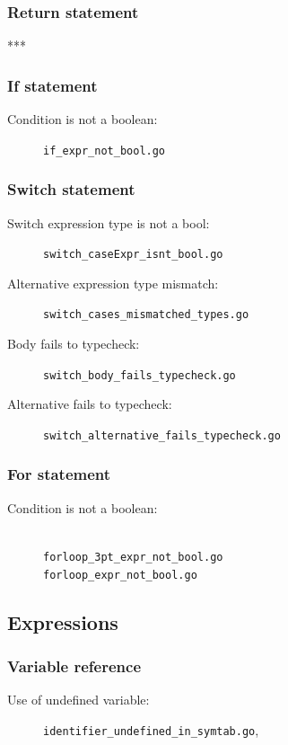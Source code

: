 \documentclass[oneside]{article}
\begin{document}
\subsubsection{Return statement}
***

\subsubsection{If statement}
\begin{description}
  \item[Condition is not a boolean:] \verb|if_expr_not_bool.go|
\end{description}

\subsubsection{Switch statement}
\begin{description}
  \item[Switch expression type is not a bool:] \verb|switch_caseExpr_isnt_bool.go|
  \item[Alternative expression type mismatch:] \verb|switch_cases_mismatched_types.go|
  \item[Body fails to typecheck:] \verb|switch_body_fails_typecheck.go|
  \item[Alternative fails to typecheck:] \verb|switch_alternative_fails_typecheck.go|
\end{description}

\subsubsection{For statement}

\begin{description}
  \item[Condition is not a boolean:] \ \\
    \verb|forloop_3pt_expr_not_bool.go| \\
    \verb|forloop_expr_not_bool.go|
\end{description}


\subsection{Expressions}

\subsubsection{Variable reference}
\begin{description}
  \item[Use of undefined variable:] \verb|identifier_undefined_in_symtab.go|,
\end{description}
\end{document}
